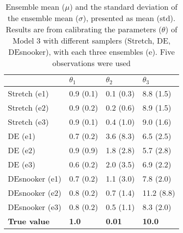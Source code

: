 \begin{table}[ht]
\caption{Ensemble mean ($\mu$) and the standard deviation of the ensemble mean ($\sigma$), presented as mean (std). Results are from calibrating the parameters ($\theta$) of Model 3 with different samplers (Stretch, DE, DEsnooker), with each three ensembles (e). Five observations were used}
\label{tab_logbook8_obs5_model3}
\begin{tabularx}{\textwidth}{XXXX}
\toprule
 & $\theta_1$ & $\theta_2$ & $\theta_3$\\
\midrule
Stretch (e1) & 0.9 (0.1) & 0.1 (0.3) & 8.8 (1.5) \\
Stretch (e2) & 0.9 (0.2) & 0.2 (0.6) & 8.9 (1.5) \\
Stretch (e3) & 0.9 (0.1) & 0.4 (1.0) & 9.0 (1.6) \\
\midrule
DE (e1) & 0.7 (0.2) & 3.6 (8.3) & 6.5 (2.5) \\
DE (e2) & 0.9 (0.9) & 1.8 (2.8) & 5.7 (2.8) \\
DE (e3) & 0.6 (0.2) & 2.0 (3.5) & 6.9 (2.2) \\
\midrule
DEsnooker (e1) & 0.7 (0.2) & 1.1 (3.0) & 7.8 (2.0) \\
DEsnooker (e2) & 0.8 (0.2) & 0.7 (1.4) & 11.2 (8.8) \\
DEsnooker (e3) & 0.8 (0.2) & 0.5 (1.1) & 8.3 (2.0) \\
\midrule
\textbf{True value} & \textbf{1.0} & \textbf{0.01} &\textbf{10.0} \\
\bottomrule
\end{tabularx}
\end{table}



